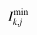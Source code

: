 

    \[\let\par\empty

    
{{{{\miitalic{I}}}\sb{{{\miitalic{k}}{\miitalic{,}}{\miitalic{j}}}}\sp{{\minormal{min}}}}}


    \]

  